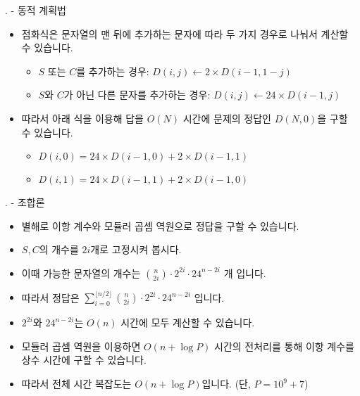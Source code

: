 \begin{frame}{\probno{}. \probtitle{} - 동적 계획법}
    \begin{itemize}
        \item 점화식은 문자열의 맨 뒤에 추가하는 문자에 따라 두 가지 경우로 나눠서 계산할 수 있습니다.
        \begin{itemize}
            \item $S$ 또는 $C$를 추가하는 경우: $D(i, j) \leftarrow 2 \times D(i-1, 1-j)$
            \item $S$와 $C$가 아닌 다른 문자를 추가하는 경우: $D(i, j) \leftarrow 24 \times D(i-1, j)$
        \end{itemize}
        \item 따라서 아래 식을 이용해 답을 $O(N)$ 시간에 문제의 정답인 $D(N, 0)$을 구할 수 있습니다.
        \begin{itemize}
            \item $D(i, 0) = 24 \times D(i-1, 0) + 2 \times D(i-1, 1)$
            \item $D(i, 1) = 24 \times D(i-1, 1) + 2 \times D(i-1, 0)$
        \end{itemize}
    \end{itemize}
\end{frame}

\begin{frame}{\probno{}. \probtitle{} - 조합론}
    \begin{itemize}
        \item 별해로 이항 계수와 모듈러 곱셈 역원으로 정답을 구할 수 있습니다.
        \item $S, C$의 개수를 $2i$개로 고정시켜 봅시다.
        \item 이때 가능한 문자열의 개수는 $\binom{n}{2i} \cdot 2^{2i} \cdot 24^{n - 2i}$ 개 입니다.
        \item 따라서 정답은 $\sum_{i=0}^{\lfloor n/2 \rfloor} \binom{n}{2i} \cdot 2^{2i} \cdot 24^{n - 2i}$ 입니다.
        \vspace{3mm}
        \item $2^{2i}$와 $24^{n-2i}$는 $O(n)$ 시간에 모두 계산할 수 있습니다.
        \item 모듈러 곱셈 역원을 이용하면 $O(n + \log P)$ 시간의 전처리를 통해 이항 계수를 상수 시간에 구할 수 있습니다.
        \item 따라서 전체 시간 복잡도는 $O(n + \log P)$입니다. (단, $P = 10^9+7$)
    \end{itemize}
\end{frame}

